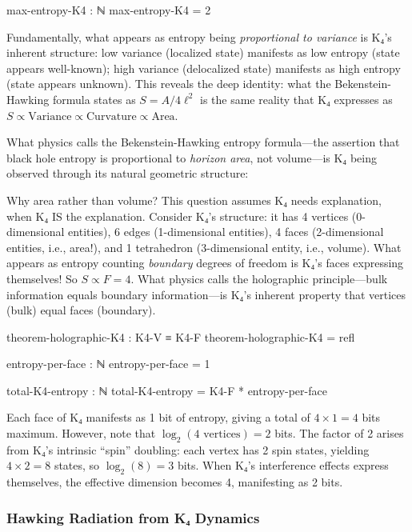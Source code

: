 \documentclass[11pt,a4paper]{book}
\begin{document}
\begin{code}
max-entropy-K4 : ℕ
max-entropy-K4 = 2
\end{code}

Fundamentally, what appears as entropy being \emph{proportional to variance} is K₄'s inherent structure: low variance (localized state) manifests as low entropy (state appears well-known); high variance (delocalized state) manifests as high entropy (state appears unknown). This reveals the deep identity: what the Bekenstein-Hawking formula states as $S = A/4\ell^2$ is the same reality that K₄ expresses as $S \propto \text{Variance} \propto \text{Curvature} \propto \text{Area}$.

What physics calls the Bekenstein-Hawking entropy formula—the assertion that black hole entropy is proportional to \emph{horizon area}, not volume—is K₄ being observed through its natural geometric structure:

Why area rather than volume? This question assumes K₄ needs explanation, when K₄ IS the explanation. Consider K₄'s structure: it has 4 vertices (0-dimensional entities), 6 edges (1-dimensional entities), 4 faces (2-dimensional entities, i.e., area!), and 1 tetrahedron (3-dimensional entity, i.e., volume). What appears as entropy counting \emph{boundary} degrees of freedom is K₄'s faces expressing themselves! So $S \propto F = 4$. What physics calls the holographic principle—bulk information equals boundary information—is K₄'s inherent property that vertices (bulk) equal faces (boundary).

\begin{code}
theorem-holographic-K4 : K4-V ≡ K4-F
theorem-holographic-K4 = refl

entropy-per-face : ℕ
entropy-per-face = 1

total-K4-entropy : ℕ
total-K4-entropy = K4-F * entropy-per-face
\end{code}

Each face of K₄ manifests as 1 bit of entropy, giving a total of $4 \times 1 = 4$ bits maximum. However, note that $\log_2(4 \text{ vertices}) = 2$ bits. The factor of 2 arises from K₄'s intrinsic ``spin'' doubling: each vertex has 2 spin states, yielding $4 \times 2 = 8$ states, so $\log_2(8) = 3$ bits. When K₄'s interference effects express themselves, the effective dimension becomes 4, manifesting as 2 bits.

\subsubsection{Hawking Radiation from K₄ Dynamics}
\end{document}
